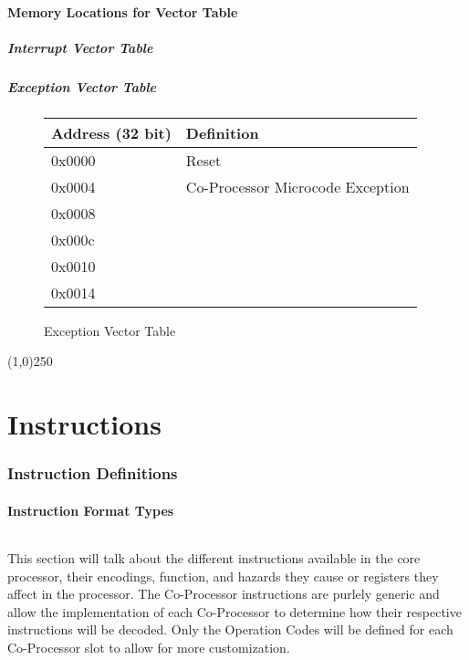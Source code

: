 \documentclass[letterpaper, 11pt]{article}
\begin{document}
\subsection{Memory Locations for Vector Table}
\subsubsection{Interrupt Vector Table}
\subsubsection{Exception Vector Table}


\begin{figure}[!h]
	\begin{center}
		\begin{tabular}{|l|l|}
			\hline
			Address (32 bit) &  Definition\\ \hline
			0x0000 & Reset \\ 	\hline
			0x0004 & Co-Processor Microcode Exception \\ 	\hline
			0x0008 &  \\ 	\hline
			0x000c &  \\ 	\hline
			0x0010 &  \\ 	\hline
			0x0014 &  \\	\hline
		\end{tabular} 
		\caption{Exception Vector Table}
	\end{center}
	
\end{figure} 

\begin{center}
	\line(1,0){250}
\end{center}

\clearpage

\part{Instructions}
\section{Instruction Definitions}
\subsection{Instruction Format Types}
\paragraph{}This section will talk about the different instructions available in the core processor, their encodings, function, and hazards
they cause or registers they affect in the processor. The Co-Processor instructions are purlely generic and allow the implementation of
each Co-Processor to determine how their respective instructions will be decoded. Only the Operation Codes will be defined for each 
Co-Processor slot to allow for more customization.
\end{document}
